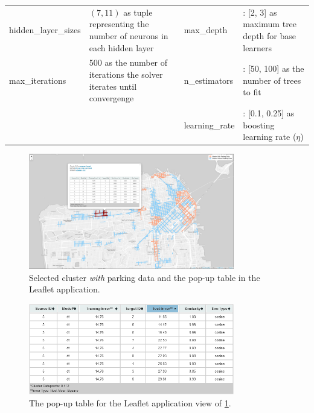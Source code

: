 \documentclass{ws-ijait}
\begin{document}
\begin{table}
{\begin{tabular}{lp{4cm}lp{4cm}}
				hidden\_layer\_sizes & $(7, 11)$ as tuple representing the number of neurons in each hidden layer & max\_depth & : [2, 3] as maximum tree depth for base learners \\
				
				max\_iterations & 500 as the number of iterations the solver iterates until convergenge & n\_estimators & : [50, 100] as the number of trees to fit\\
				
				& & learning\_rate & : [0.1, 0.25] as boosting learning rate ($\eta$)
				
				\botrule
		\end{tabular}}
		\label{tab:ml_params}
	\end{table}
	
	\begin{figure}[!ht]
		\centering
		\includegraphics[width=0.8\textwidth]{../graphics/cwith_source_dt_cosine.png}
		\caption{Selected cluster \textit{with} parking data and the pop-up table in the Leaflet application.}
		\label{fig:cwith}
	\end{figure}
	
	\begin{figure}[!ht]
		\centering
		\includegraphics[width=0.8\textwidth]{../graphics/cwith_source_dt_cosine_table.png}
		\caption{The pop-up table for the Leaflet application view of \cref{fig:cwith}.}
		\label{fig:cwith_table}
	\end{figure}
	
\end{document}
